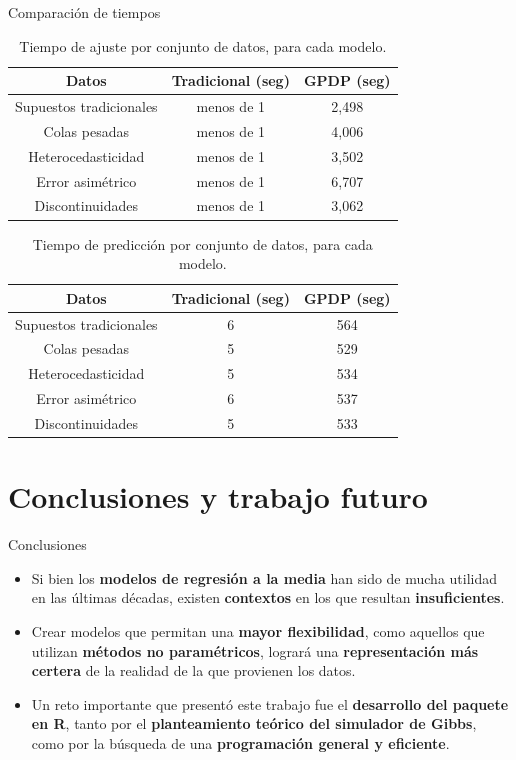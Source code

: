 \documentclass{beamer}
\begin{document}
\begin{frame}{Comparaci\'on de tiempos}
\begin{scriptsize}
\begin{table}[H]
\centering
\caption{Tiempo de ajuste por conjunto de datos, para cada modelo.} 
\begin{tabular}{ccc}
  \hline
Datos & Tradicional (seg) & GPDP (seg) \\ 
  \hline
Supuestos tradicionales & menos de 1 & 2,498 \\ 
  Colas pesadas & menos de 1 & 4,006 \\ 
  Heterocedasticidad & menos de 1 & 3,502 \\ 
  Error asim\'etrico & menos de 1 & 6,707 \\ 
  Discontinuidades & menos de 1 & 3,062 \\ 
   \hline
\end{tabular}
\label{fit_time}
\end{table}

\begin{table}[H]
\centering
\caption{Tiempo de predicci\'on por conjunto de datos, para cada modelo.} 
\begin{tabular}{ccc}
  \hline
Datos & Tradicional (seg) & GPDP (seg) \\ 
  \hline
Supuestos tradicionales & 6 & 564 \\ 
  Colas pesadas & 5 & 529 \\ 
  Heterocedasticidad & 5 & 534 \\ 
  Error asim\'etrico & 6 & 537 \\ 
  Discontinuidades & 5 & 533 \\ 
   \hline
\end{tabular}
\label{pred_time}
\end{table}   
\end{scriptsize}
\end{frame}

\section{Conclusiones y trabajo futuro}

\begin{frame}{Conclusiones}
    \begin{itemize}
        \setlength\itemsep{2em}
        \item {Si bien los \textbf{modelos de regresi\'on a la media} han sido de mucha utilidad en las \'ultimas d\'ecadas, existen \textbf{contextos} en los que resultan \textbf{insuficientes}.}
        \item {Crear modelos que permitan una \textbf{mayor flexibilidad}, como aquellos que utilizan \textbf{m\'etodos no param\'etricos}, lograr\'a una \textbf{representaci\'on m\'as certera} de la realidad de la que provienen los datos.}
        \item {Un reto importante que present\'o este trabajo fue el \textbf{desarrollo del paquete en R}, tanto por el \textbf{planteamiento te\'orico del simulador de Gibbs}, como por la b\'usqueda de una \textbf{programaci\'on general y eficiente}.}
    \end{itemize}
\end{frame}{}
\end{document}
